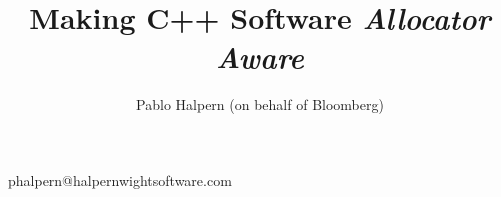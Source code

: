 
\title{Making C++ Software \emph{Allocator Aware}}
\author{Pablo Halpern (on behalf of Bloomberg)}{phalpern@halpernwightsoftware.com}
